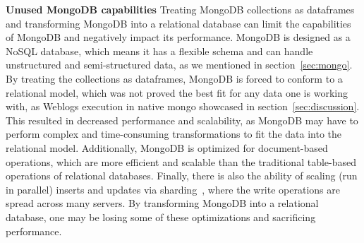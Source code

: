 \par{\textbf{Unused MongoDB capabilities}}
Treating MongoDB collections as dataframes and transforming MongoDB into a relational database can limit 
the capabilities of MongoDB and negatively impact its performance. 
MongoDB is designed as a NoSQL database, which means it has a flexible schema and can handle unstructured 
and semi-structured data, as we mentioned in section~\ref{sec:mongo}. 
By treating the collections as dataframes, MongoDB is forced to conform to a relational model, 
which was not proved the best fit for any data one is working with, 
as Weblogs execution in native mongo showcased in section~\ref{sec:discussion}.
This resulted in decreased performance and scalability, 
as MongoDB may have to perform complex and time-consuming transformations 
to fit the data into the relational model. 
Additionally, MongoDB is optimized for document-based operations, 
which are more efficient and scalable than 
the traditional table-based operations of relational databases. 
Finally, there is also the ability of scaling (run in parallel) inserts and updates 
via sharding~\cite{MongoDBSHarding}, 
where the write operations are spread across many servers.
By transforming MongoDB into a relational database, 
one may be losing some of these optimizations and sacrificing performance. 



